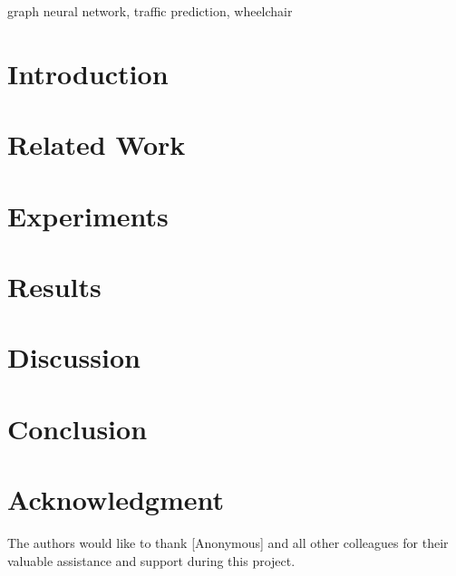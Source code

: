 \documentclass[conference]{IEEEtran}
\begin{document}
    \begin{IEEEkeywords}
        graph neural network, traffic prediction, wheelchair
    \end{IEEEkeywords}


    \section{Introduction}\label{sec:introduction}
    


    \section{Related Work}\label{sec:related-work}
    


    \section{Experiments}\label{sec:experiments}
    


    \section{Results}\label{sec:results}
    


    \section{Discussion}\label{sec:discussion}
    


    \section{Conclusion}\label{sec:conclusion}
    

    \section*{Acknowledgment}
    The authors would like to thank [Anonymous] and all other colleagues for their valuable assistance and support during this project.
    \vspace{1em}

    
    
\end{document}
